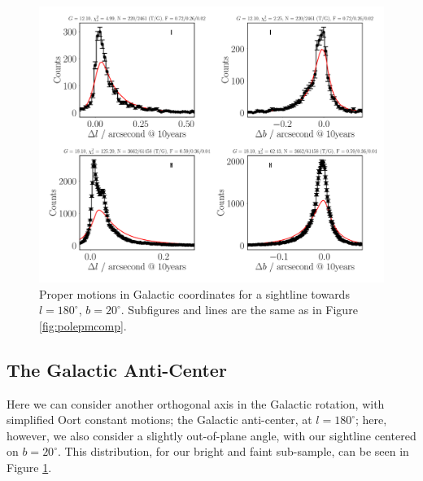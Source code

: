 \documentclass[fleqn,usenatbib]{mnras}
\begin{document}
\begin{figure}
    \centering
    \includegraphics[width=\columnwidth]{Plots/plots_pm_gaia_180_20.pdf}
    \caption{Proper motions in Galactic coordinates for a sightline towards $l = 180^\circ$, $b = 20^\circ$.
    Subfigures and lines are the same as in Figure \ref{fig:polepmcomp}.}
    \label{fig:l180comp}
\end{figure}

\subsection{The Galactic Anti-Center}
Here we can consider another orthogonal axis in the Galactic rotation, with simplified Oort constant motions; the Galactic anti-center, at $l=180^\circ$; here, however, we also consider a slightly out-of-plane angle, with our sightline centered on $b = 20^\circ$.
This distribution, for our bright and faint sub-sample, can be seen in Figure \ref{fig:l180comp}.
\end{document}
